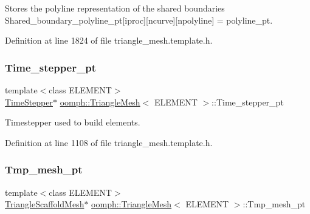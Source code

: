 Stores the polyline representation of the shared boundaries Shared\+\_\+boundary\+\_\+polyline\+\_\+pt\mbox{[}iproc\mbox{]}\mbox{[}ncurve\mbox{]}\mbox{[}npolyline\mbox{]} = polyline\+\_\+pt. 



Definition at line 1824 of file triangle\+\_\+mesh.\+template.\+h.

\mbox{\label{classoomph_1_1TriangleMesh_a0478e2d31a2787eb4536bb61aa4bbbfd}} 
\subsubsection{\texorpdfstring{Time\+\_\+stepper\+\_\+pt}{Time\_stepper\_pt}}
{\footnotesize\ttfamily template$<$class E\+L\+E\+M\+E\+NT$>$ \\
\hyperlink{classoomph_1_1TimeStepper}{Time\+Stepper}$\ast$ \hyperlink{classoomph_1_1TriangleMesh}{oomph\+::\+Triangle\+Mesh}$<$ E\+L\+E\+M\+E\+NT $>$\+::Time\+\_\+stepper\+\_\+pt}



Timestepper used to build elements. 



Definition at line 1108 of file triangle\+\_\+mesh.\+template.\+h.

\mbox{\label{classoomph_1_1TriangleMesh_a0c0fd18f3ec5d004370ba590d6c952d4}} 
\subsubsection{\texorpdfstring{Tmp\+\_\+mesh\+\_\+pt}{Tmp\_mesh\_pt}}
{\footnotesize\ttfamily template$<$class E\+L\+E\+M\+E\+NT$>$ \\
\hyperlink{classoomph_1_1TriangleScaffoldMesh}{Triangle\+Scaffold\+Mesh}$\ast$ \hyperlink{classoomph_1_1TriangleMesh}{oomph\+::\+Triangle\+Mesh}$<$ E\+L\+E\+M\+E\+NT $>$\+::Tmp\+\_\+mesh\+\_\+pt\hspace{0.3cm}{\ttfamily [protected]}}



